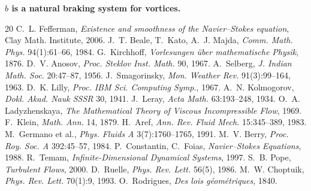 \documentclass[11pt,a4paper]{article}
\begin{document}
\textbf{$b$ is a natural braking system for vortices.}

\begin{thebibliography}{20}
 C.~L. Fefferman, \textit{Existence and smoothness of the Navier--Stokes equation}, Clay Math. Institute, 2006.
 J.~T. Beale, T.~Kato, A.~J. Majda, \textit{Comm. Math. Phys.} 94(1):61--66, 1984.
 G.~Kirchhoff, \textit{Vorlesungen über mathematische Physik}, 1876.
 D.~V. Anosov, \textit{Proc. Steklov Inst. Math.} 90, 1967.
 A.~Selberg, \textit{J. Indian Math. Soc.} 20:47--87, 1956.
 J.~Smagorinsky, \textit{Mon. Weather Rev.} 91(3):99--164, 1963.
 D.~K. Lilly, \textit{Proc. IBM Sci. Computing Symp.}, 1967.
 A.~N. Kolmogorov, \textit{Dokl. Akad. Nauk SSSR} 30, 1941.
 J.~Leray, \textit{Acta Math.} 63:193--248, 1934.
 O.~A. Ladyzhenskaya, \textit{The Mathematical Theory of Viscous Incompressible Flow}, 1969.
 F.~Klein, \textit{Math. Ann.} 14, 1879.
 H.~Aref, \textit{Ann. Rev. Fluid Mech.} 15:345--389, 1983.
 M.~Germano et al., \textit{Phys. Fluids A} 3(7):1760--1765, 1991.
 M.~V. Berry, \textit{Proc. Roy. Soc. A} 392:45--57, 1984.
 P.~Constantin, C.~Foias, \textit{Navier--Stokes Equations}, 1988.
 R.~Temam, \textit{Infinite-Dimensional Dynamical Systems}, 1997.
 S.~B. Pope, \textit{Turbulent Flows}, 2000.
 D.~Ruelle, \textit{Phys. Rev. Lett.} 56(5), 1986.
 M.~W. Choptuik, \textit{Phys. Rev. Lett.} 70(1):9, 1993.
 O.~Rodrigues, \textit{Des lois géométriques}, 1840.
\end{thebibliography}
\end{document}
